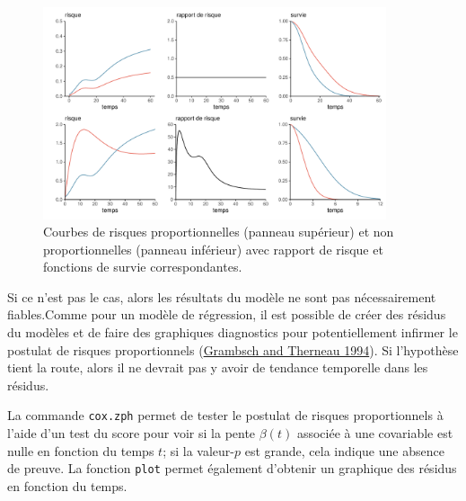 \documentclass[
  11pt,
  letterpaper,
]{scrbook}
\theoremstyle{definition}
\theoremstyle{remark}
\begin{document}
\begin{figure}[ht!]

{\centering \includegraphics[width=0.9\textwidth,height=\textheight]{./06-survie_files/figure-pdf/fig-risquepropfig-1.pdf}

}

\caption{\label{fig-risquepropfig}Courbes de risques proportionnelles
(panneau supérieur) et non proportionnelles (panneau inférieur) avec
rapport de risque et fonctions de survie correspondantes.}

\end{figure}

Si ce n'est pas le cas, alors les résultats du modèle ne sont pas
nécessairement fiables.Comme pour un modèle de régression, il est
possible de créer des résidus du modèles et de faire des graphiques
diagnostics pour potentiellement infirmer le postulat de risques
proportionnels (\protect\hyperlink{ref-Grambsch.Therneau:1994}{Grambsch
and Therneau 1994}). Si l'hypothèse tient la route, alors il ne devrait
pas y avoir de tendance temporelle dans les résidus.

La commande \texttt{cox.zph} permet de tester le postulat de risques
proportionnels à l'aide d'un test du score pour voir si la pente
\(\beta(t)\) associée à une covariable est nulle en fonction du temps
\(t\); si la valeur-\(p\) est grande, cela indique une absence de
preuve. La fonction \texttt{plot} permet également d'obtenir un
graphique des résidus en fonction du temps.
\end{document}
